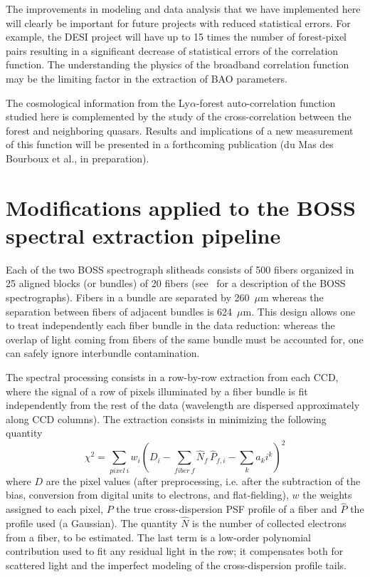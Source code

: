\documentclass{aa}
\newcommand{\lya}{Ly$\alpha$}
\begin{document}
The improvements in modeling and data analysis that we have implemented
here will clearly be important for future projects with
reduced statistical errors.  For example, the
DESI project \citep{2016arXiv161100036D} will have up to 15 times
the number of forest-pixel pairs resulting in a significant decrease
of statistical errors of the correlation function.
The understanding the physics of the
broadband correlation function may be the limiting factor in
the extraction of BAO parameters.


The cosmological information from the \lya-forest auto-correlation function
studied here is complemented by the study of the cross-correlation
between the forest and neighboring quasars.
Results and implications of a new measurement of this function will
be presented in a forthcoming publication
(du Mas des Bourboux et al., in preparation).





\appendix

\section{Modifications applied to the BOSS spectral extraction pipeline}
\label{sec:new_pipeline}







Each of the two  BOSS spectrograph slitheads consists of 500 fibers organized in 25 aligned blocks (or bundles) of 20 fibers (see~\citealt{2013AJ....146...32S} for a description of the BOSS spectrographs). Fibers in a bundle are separated by 260~$\mu$m whereas the separation between fibers of adjacent bundles is 624~$\mu$m.  
This design allows one to treat independently each fiber bundle in the data reduction:  whereas the overlap of light coming from fibers of the same bundle must be accounted for, one can safely ignore
interbundle contamination.


The spectral processing consists in a row-by-row extraction from each CCD,
where the signal of a row of pixels illuminated by a fiber bundle is fit independently from the rest of the data (wavelength are dispersed approximately along CCD columns).
The extraction consists in minimizing the following quantity 
$$ \chi^2 = \sum_{pixel\ i} w_{i} \left( D_{i} - \sum_{fiber\ f} \hat{N}_{f} \, \hat{P}_{f,i} - \sum_k a_k i^k \right)^2$$
where $D$ are the pixel values (after preprocessing, i.e. after the subtraction of the bias, conversion from digital units to electrons, and flat-fielding), $w$ the weights assigned to each pixel, $P$ the true cross-dispersion PSF profile
of a fiber and $\hat{P}$ the profile used (a Gaussian).
The quantity $\hat{N}$ is the number of collected electrons from a fiber, to be estimated. The last term is a low-order polynomial contribution used to fit any residual light in the row; it  compensates both for scattered light and the imperfect modeling of the cross-dispersion profile tails.
\end{document}
